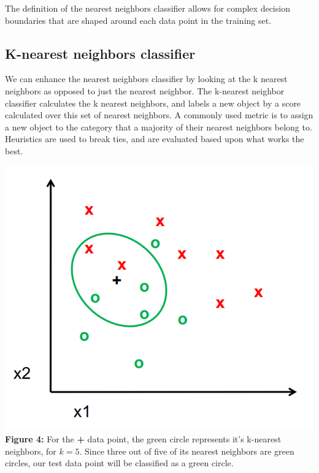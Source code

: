\documentclass{article}
\begin{document}
The definition of the nearest neighbors classifier allows for complex decision boundaries that are shaped around each data point in the training set. \\

\subsection{K-nearest neighbors classifier}
We can enhance the nearest neighbors classifier by looking at the k nearest neighbors as opposed to just the nearest neighbor. The k-nearest neighbor classifier calculates the k nearest neighbors, and labels a new object by a score calculated over this set of nearest neighbors. A commonly used metric is to assign a new object to the category that a majority of their nearest neighbors belong to. Heuristics are used to break ties, and are evaluated based upon what works the best. \\

\begin{center}
	\includegraphics[scale=0.35]{knearestneighbors.png}\\
    \textbf{Figure 4:} For the \textbf{+} data point, the green circle represents it's k-nearest neighbors, for $k=5$. Since three out of five of its nearest neighbors are green circles, our test data point will be classified as a green circle. \cite{lecture11} \\
\end{center}
\end{document}
